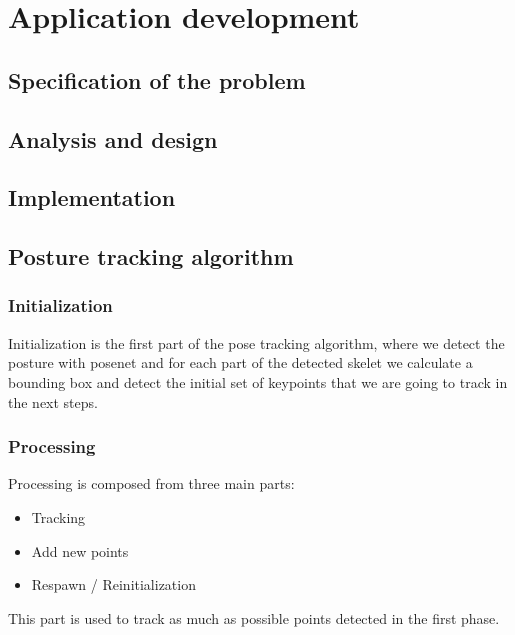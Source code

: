 \section{Application development}
\subsection{Specification of the problem}
\subsection{Analysis and design}
\subsection{Implementation}
\subsection{Posture tracking algorithm}

\subsubsection{Initialization}
Initialization is the first part of the pose tracking algorithm, where we detect the posture with posenet and for each part of the detected skelet we calculate a bounding box and detect the initial set of keypoints that we are going to track in the next steps.
\subsubsection{Processing}
Processing is composed from three main parts: 
\begin{itemize}
    \item Tracking 
    \item Add new points 
    \item Respawn / Reinitialization
\end{itemize}
This part is used to track as much as possible points detected in the first phase.

